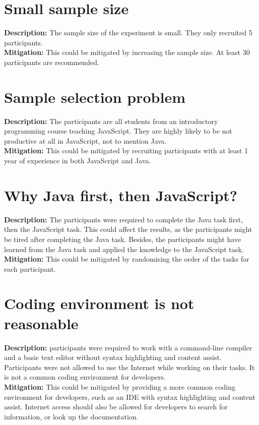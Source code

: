 \documentclass{article}
\begin{document}
\section{Small sample size}
\textbf{Description:} The sample size of the experiment is small. They only recruited 5 participants.\\
\textbf{Mitigation:} This could be mitigated by increasing the sample size. At least 30 participants are recommended.

\section{Sample selection problem}
\textbf{Description:} The participants are all students from an introductory programming course teaching JavaScript. They are highly likely to be not productive at all in JavaScript, not to mention Java.\\
\textbf{Mitigation:} This could be mitigated by recruiting participants with at least 1 year of experience in both JavaScript and Java.

\section{Why Java first, then JavaScript?}
\textbf{Description:} The participants were required to complete the Java task first, then the JavaScript task. This could affect the results, as the participants might be tired after completing the Java task. Besides, the participants might have learned from the Java task and applied the knowledge to the JavaScript task.\\
\textbf{Mitigation:} This could be mitigated by randomising the order of the tasks for each participant.

\section{Coding environment is not reasonable}
\textbf{Description:} participants were required to work with a
command-line compiler and a basic text editor without syntax highlighting and content assist.
Participants were not allowed to use the Internet while working on their tasks. It is not a common coding environment for developers.\\
\textbf{Mitigation:} This could be mitigated by providing a more common coding environment for developers, such as an IDE with syntax highlighting and content assist. Internet access should also be allowed for developers to search for information, or look up the documentation.
\end{document}
